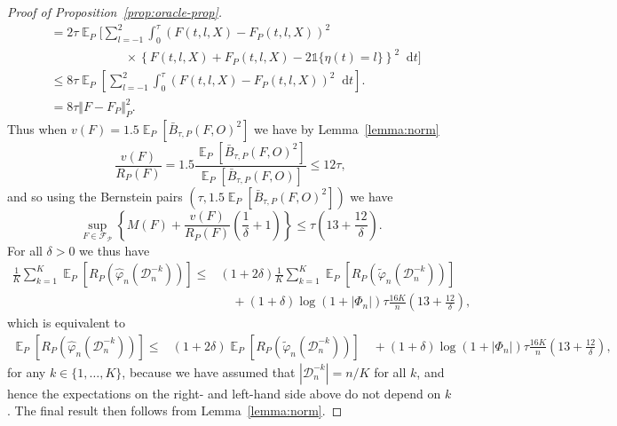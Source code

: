 \documentclass[alpha-refs]{wiley-article}
\DeclareMathOperator{\E}{\mathbb{E}} %
\renewcommand{\phi}{\varphi}
\newcommand*\diff{\mathop{}\!\mathrm{d}}
\newcommand{\1}{\mathbb{1}}
\newcommand{\data}{\ensuremath{\mathcal{D}}}
\begin{document}
\begin{proof}[Proof of Proposition~\ref{prop:oracle-prop}]
\begin{align*}
  & =2\tau
    \E_{P}\Bigg[
    \sum_{l=-1}^{2} \int_0^{\tau}
    \left(
    F(t, l, X) - F_P(t, l, X)
    \right)^2
  \\
  & \quad \quad \quad\quad \quad \quad \times
    \left\{
    F(t, l, X) +  F_P(t, l, X)-2 \1{\{\eta(t) = l\}}
    \right\}^2
    \diff t 
    \Bigg]
  \\
  & \leq
    8\tau \E_{P}{\left[
    \sum_{l=-1}^{2} \int_0^{\tau}
    \left(
    F(t, l, X) - F_P(t, l, X)
    \right)^2
    \diff t 
    \right]}.
  \\
  & =
    8\tau \Vert F - F_P \Vert_{P}^2.
\end{align*}
Thus when \( v(F) = 1.5 \E_P{[\bar{B}_{\tau,P}(F, O)^2]} \) we have by
Lemma~\ref{lemma:norm}
\begin{equation*}
  \frac{v(F)}{R_P(F)}
  = 1.5 \frac{\E_P{[\bar{B}_{\tau,P}(F, O)^2]}}{\E_P{[\bar{B}_{\tau,P}(F, O)]}}
  \leq 12 \tau,
\end{equation*}
and so using the Bernstein pairs \( (\tau, 1.5 \E_P{[\bar{B}_{\tau,P}(F, O)^2]}) \) we have
\begin{equation*}
  \sup_{F \in \mathcal{F}_{\mathcal{P}}}
  \left\{
    M(F) + \frac{v(F)}{R_P(F)}
    \left(
      \frac{1}{\delta} + 1
    \right)
  \right\}
  \leq \tau
  \left(
    13 + \frac{12}{\delta}
  \right).
\end{equation*}
For all $\delta>0$ we thus have
\begin{align*}
  \frac{1}{K} \sum_{k=1}^{K} \E_{P}{\left[ R_P(\hat{\phi}_n(\data_n^{-k})) \right]}
  \leq
  &(1+2\delta)\frac{1}{K} \sum_{k=1}^{K}\E_{P}{\left[ R_P(\tilde{\phi}_n(\data_n^{-k})) \right]}
  \\
  & \quad
    + (1+\delta)\log(1 + |\Phi_n|) \tau \frac{16 K}{n}
    \left(
    13 + \frac{12}{\delta}
    \right),
\end{align*}
which is equivalent to
\begin{align*}
   \E_{P}{\left[ R_P(\hat{\phi}_n(\data_n^{-k})) \right]}
  \leq
  &(1+2\delta) \E_{P}{\left[ R_P(\tilde{\phi}_n(\data_n^{-k})) \right]}
    \quad
    + (1+\delta)\log(1 + |\Phi_n|) \tau \frac{16 K}{n}
    \left(
    13 + \frac{12}{\delta}
    \right),
\end{align*}
for any \( k\in \{1, \dots, K\} \), because we have assumed that
\( |\data_n^{-k}| = n/K \) for all \( k \), and hence the expectations
on the right- and left-hand side above do not depend on \( k \). The
final result then follows from Lemma~\ref{lemma:norm}.
\end{proof}
\end{document}
